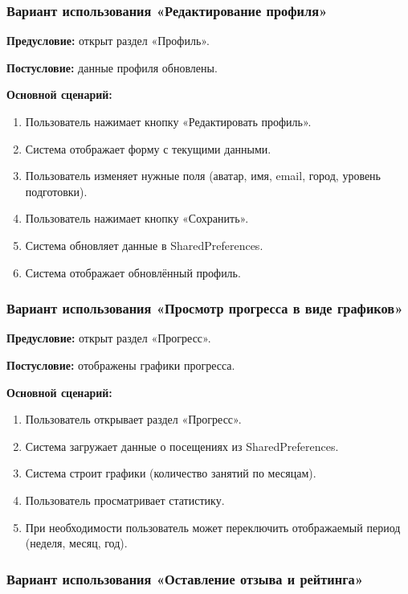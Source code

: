 \subsubsection{Вариант использования «Редактирование профиля»}

\textbf{Предусловие:} открыт раздел «Профиль».

\textbf{Постусловие:} данные профиля обновлены.

\textbf{Основной сценарий:}
\begin{enumerate}
	\item Пользователь нажимает кнопку «Редактировать профиль».
	\item Система отображает форму с текущими данными.
	\item Пользователь изменяет нужные поля (аватар, имя, email, город, уровень подготовки).
	\item Пользователь нажимает кнопку «Сохранить».
	\item Система обновляет данные в SharedPreferences.
	\item Система отображает обновлённый профиль.
\end{enumerate}

\subsubsection{Вариант использования «Просмотр прогресса в виде графиков»}

\textbf{Предусловие:} открыт раздел «Прогресс».

\textbf{Постусловие:} отображены графики прогресса.

\textbf{Основной сценарий:}
\begin{enumerate}
	\item Пользователь открывает раздел «Прогресс».
	\item Система загружает данные о посещениях из SharedPreferences.
	\item Система строит графики (количество занятий по месяцам).
	\item Пользователь просматривает статистику.
	\item При необходимости пользователь может переключить отображаемый период (неделя, месяц, год).
\end{enumerate}

\subsubsection{Вариант использования «Оставление отзыва и рейтинга»}

